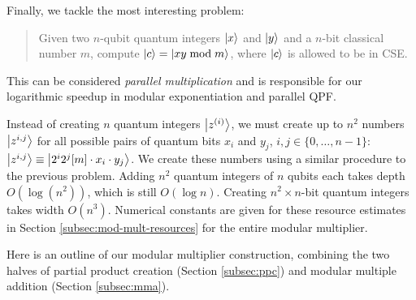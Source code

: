 
Finally, we tackle the most interesting problem:
\begin{quote}
Given two $n$-qubit quantum integers $\left\vert{x}\right\rangle$ and
$\left\vert{y}\right\rangle$ and a $n$-bit classical number
$m$,
compute $\left\vert{c}\right\rangle = \left\vert{xy \bmod m}\right\rangle$,
where $\left\vert{c}\right\rangle$ is allowed to be in CSE.
\end{quote}

This can be considered \emph{parallel multiplication} and is responsible
for our logarithmic speedup in modular exponentiation and parallel QPF.


Instead of creating $n$ quantum integers $\left\vert{z^{(i)}}\right\rangle$, we must create
up to $n^2$ numbers
$\left\vert{z^{i,j}}\right\rangle$ for all possible pairs of quantum bits $x_i$ and $y_j$,
$i,j \in \{0,\ldots,n-1\}$:
$\left\vert{z^{i,j}}\right\rangle \equiv \left\vert{2^i2^j[m]\cdot x_i \cdot y_j}\right\rangle$.
We create these numbers using a similar procedure to the previous problem.
Adding $n^2$ quantum integers of $n$ qubits each takes depth
$O(\log(n^2))$, which is still $O(\log n)$.
Creating $n^2\times n$-bit quantum integers takes width $O(n^3)$.
Numerical constants are given for these resource estimates in
Section \ref{subsec:mod-mult-resources} for the entire modular multiplier.

Here is an outline of our modular multiplier construction, combining the
two halves of partial product creation (Section \ref{subsec:ppc}) and
modular multiple addition (Section \ref{subsec:mma}).

